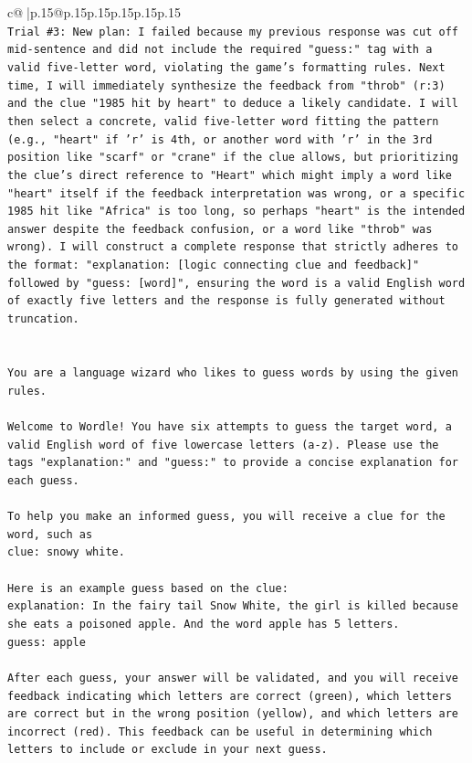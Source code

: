 \documentclass{article}
\begin{document}
{\begin{supertabular}{c@{$\;$}|p{.15\linewidth}@{}p{.15\linewidth}p{.15\linewidth}p{.15\linewidth}p{.15\linewidth}p{.15\linewidth}}
{{{\\ 
\texttt{Trial \#3: New plan: I failed because my previous response was cut off mid{-}sentence and did not include the required "guess:" tag with a valid five{-}letter word, violating the game's formatting rules. Next time, I will immediately synthesize the feedback from "throb" (r:3) and the clue "1985 hit by heart" to deduce a likely candidate. I will then select a concrete, valid five{-}letter word fitting the pattern (e.g., "heart" if 'r' is 4th, or another word with 'r' in the 3rd position like "scarf" or "crane" if the clue allows, but prioritizing the clue's direct reference to "Heart" which might imply a word like "heart" itself if the feedback interpretation was wrong, or a specific 1985 hit like "Africa" is too long, so perhaps "heart" is the intended answer despite the feedback confusion, or a word like "throb" was wrong). I will construct a complete response that strictly adheres to the format: "explanation: {[}logic connecting clue and feedback{]}" followed by "guess: {[}word{]}", ensuring the word is a valid English word of exactly five letters and the response is fully generated without truncation.} \\
\\ 
\\ 
\texttt{You are a language wizard who likes to guess words by using the given rules.} \\
\\ 
\texttt{Welcome to Wordle! You have six attempts to guess the target word, a valid English word of five lowercase letters (a{-}z). Please use the tags "explanation:" and "guess:" to provide a concise explanation for each guess.} \\
\\ 
\texttt{To help you make an informed guess, you will receive a clue for the word, such as} \\
\texttt{clue: snowy white.} \\
\\ 
\texttt{Here is an example guess based on the clue:} \\
\texttt{explanation: In the fairy tail Snow White, the girl is killed because she eats a poisoned apple. And the word apple has 5 letters.} \\
\texttt{guess: apple} \\
\\ 
\texttt{After each guess, your answer will be validated, and you will receive feedback indicating which letters are correct (green), which letters are correct but in the wrong position (yellow), and which letters are incorrect (red). This feedback can be useful in determining which letters to include or exclude in your next guess.} \\
}}}
\end{supertabular}}
\end{document}
